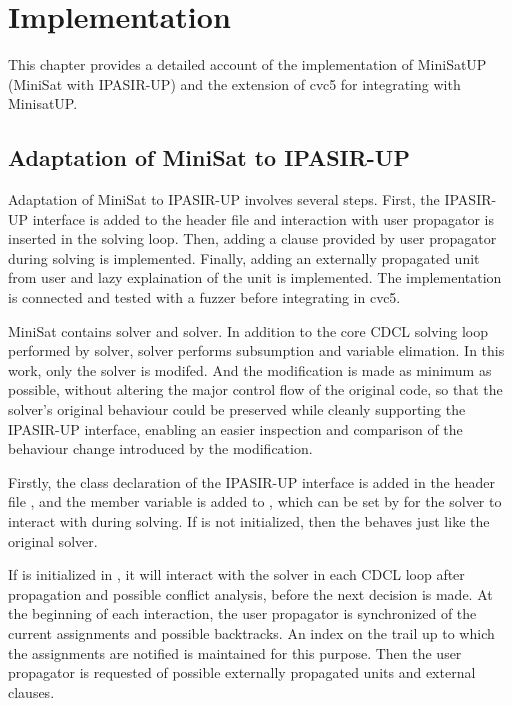 \chapter{Implementation}

This chapter provides a detailed account of the implementation of MiniSatUP (MiniSat with IPASIR-UP) and the extension of cvc5 for integrating with MinisatUP.

\section{Adaptation of MiniSat to IPASIR-UP}

Adaptation of MiniSat to IPASIR-UP involves several steps. First, the IPASIR-UP interface is added to the header file and interaction with user propagator is inserted in the solving loop. Then, adding a clause provided by user propagator during solving is implemented. Finally, adding an externally propagated unit from user and lazy explaination of the unit is implemented. The implementation is connected and tested with a fuzzer before integrating in cvc5.

MiniSat contains  solver and  solver. In addition to the core CDCL solving loop performed by  solver,  solver performs subsumption and variable elimation. In this work, only the  solver is modifed. And the modification is made as minimum as possible, without altering the major control flow of the original code, so that the solver's original behaviour could be preserved while cleanly supporting the IPASIR-UP interface, enabling an easier inspection and comparison of the behaviour change introduced by the modification.

Firstly, the  class declaration of the IPASIR-UP interface is added in the header file , and the  member variable is added to , which can be set by  for the solver to interact with during solving. If  is not initialized, then the  behaves just like the original solver.

If  is initialized in , it will interact with the solver in each CDCL loop after propagation and possible conflict analysis, before the next decision is made. At the beginning of each interaction, the user propagator is synchronized of the current assignments and possible backtracks. An index on the trail up to which the assignments are notified is maintained for this purpose. Then the user propagator is requested of possible externally propagated units and external clauses.

